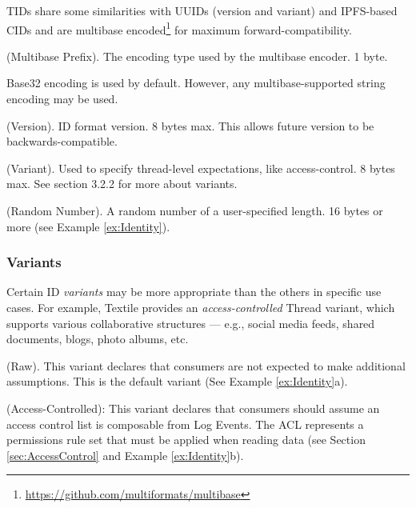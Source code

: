 \documentclass{textile}
\begin{document}
TIDs share some similarities with UUIDs \cite{leachUniversallyUniqueIDentifier2005} (version and variant) and IPFS-based CIDs and are multibase encoded\footnote{\url{https://github.com/multiformats/multibase}} for maximum forward-compatibility.

\begin{definition}
(Multibase Prefix). The encoding type used by the multibase encoder. 1 byte.
\end{definition}

Base32 encoding is used by default. However, any multibase-supported string encoding may be used.

\begin{definition}
(Version). ID format version. 8 bytes max. This allows future version to be backwards-compatible.
\end{definition}

\begin{definition}
(Variant). Used to specify thread-level expectations, like access-control. 8 bytes max. See section 3.2.2 for more about variants.
\end{definition}

\begin{definition}
(Random Number). A random number of a user-specified length. 16 bytes or more  (see Example \ref{ex:Identity}).
\end{definition}

\subsubsection{Variants}

Certain ID \emph{variants} may be more appropriate than the others in specific use cases. For example, Textile provides an \emph{access-controlled} Thread variant, which supports various collaborative structures --- e.g., social media feeds, shared documents, blogs, photo albums, etc.

\begin{definition}
(Raw). This variant declares that consumers are not expected to make additional assumptions. This is the default variant (See Example \ref{ex:Identity}a).
\end{definition}

\begin{definition}
(Access-Controlled): This variant declares that consumers should assume an access control list is composable from Log Events. The ACL represents a permissions rule set that must be applied when reading data (see Section  \ref{sec:AccessControl} and Example \ref{ex:Identity}b).
\end{definition}
\end{document}

